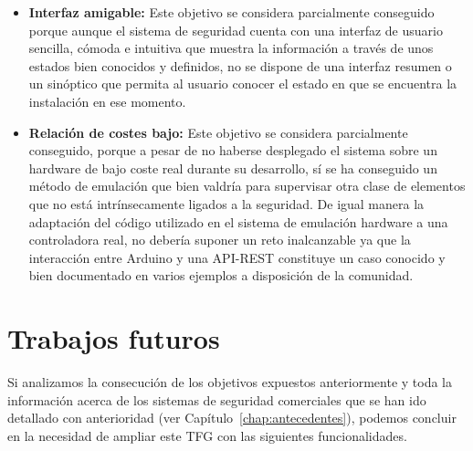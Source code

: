 \begin{itemize}
\item \textbf{Interfaz amigable:} Este objetivo se considera parcialmente conseguido porque aunque el sistema de seguridad cuenta con una interfaz de usuario sencilla, cómoda e intuitiva que muestra la información a través de unos estados bien conocidos y definidos, no se dispone de una interfaz resumen o un sinóptico que permita al usuario conocer el estado en que se encuentra la instalación en ese momento.

\item \textbf{Relación de costes bajo: }Este objetivo se considera parcialmente conseguido, porque a pesar de no haberse desplegado el sistema sobre un hardware de bajo coste real durante su desarrollo, sí se ha conseguido un método de emulación que bien valdría para supervisar otra clase de elementos que no está intrínsecamente ligados a la seguridad. De igual manera la adaptación del código utilizado en el sistema de emulación hardware a una controladora real, no debería suponer un reto inalcanzable ya que la interacción entre Arduino y una \acs{API}-\acs{REST} constituye un caso conocido y bien documentado en varios ejemplos a disposición de la comunidad.

\end{itemize} 

\section{Trabajos futuros}

Si analizamos la consecución de los objetivos expuestos anteriormente y toda la información acerca de los sistemas de seguridad comerciales que se han ido detallado con anterioridad (ver Capítulo~\ref{chap:antecedentes}), podemos concluir en la necesidad de ampliar este \acs{TFG} con las siguientes funcionalidades.

